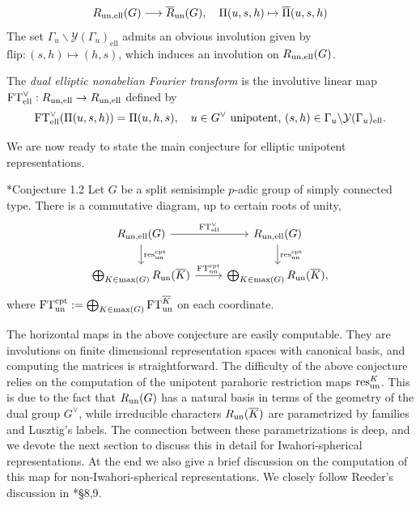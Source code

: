 \begin{equation}
    R_{\mathrm{un},\mathrm{ell}}(G)\longrightarrow\overline{R}_{\mathrm{un}}(G),\quad\Pi(u,s,h)\mapsto\overline{\Pi}(u,s,h)
\end{equation}
The set $\Gamma_u\backslash\mathcal{Y}(\Gamma_u)_{\mathrm{ell}}$ admits an obvious involution given by $\mathrm{flip}:(s,h)\mapsto(h,s)$, which induces an involution on $R_{\mathrm{un},\mathrm{ell}}(G)$.
\begin{definition}
    The \textit{dual elliptic nonabelian Fourier transform} is the involutive linear map $\mathrm{FT}^\vee_{\mathrm{ell}}:R_{\mathrm{un},\mathrm{ell}}\rightarrow R_{\mathrm{un},\mathrm{ell}}$ defined by
    \begin{equation*}
        \mathrm{FT}^\vee_{\mathrm{ell}}(\Pi(u,s,h))=\Pi(u,h,s),\quad u\in G^\vee\text{ unipotent, }(s,h)\in\Gamma_u\backslash\mathcal{Y}(\Gamma_u)_{\mathrm{ell}}.
    \end{equation*}
\end{definition}

We are now ready to state the main conjecture for elliptic unipotent representations.

\begin{conjecture}\cite{AubertCiubotaruRomano2024}*{Conjecture 1.2}
    Let $G$ be a split semisimple $p$-adic group of simply connected type. There is a commutative diagram, up to certain roots of unity,
    \[
        \begin{tikzcd}
        R_{\un,\text{ell}}(G) \arrow[r, "\FT^\vee_{\text{ell}}"] \arrow[d, "\res_{\un}^{\cpt}"] & R_{\un,\text{ell}}(G) \arrow[d, "\res_{\un}^{\cpt}"] \\
        \bigoplus_{K\in\max(G)}R_{\un}(\overline{K}) \arrow[r, "\FT^{\cpt}_{\un}"] & \bigoplus_{K\in\max(G)}R_{\un}(\overline{K}),
        \end{tikzcd}
    \]
    where $\mathrm{FT}^{\mathrm{cpt}}_{\mathrm{un}}:=\bigoplus_{K\in\max(G)}\mathrm{FT}^{\overline{K}}_{\mathrm{un}}$ on each coordinate.
\end{conjecture}

The horizontal maps in the above conjecture are easily computable. They are involutions on finite dimensional representation spaces with canonical basis, and computing the matrices is straightforward. The difficulty of the above conjecture relies on the computation of the unipotent parahoric restriction maps $\mathrm{res}^K_{\mathrm{un}}$. This is due to the fact that $R_{\mathrm{un}}(G)$ has a natural basis in terms of the geometry of the dual group $G^\vee$, while irreducible characters $R_{\mathrm{un}}(\overline{K})$ are parametrized by families and Lusztig's labels. The connection between these parametrizations is deep, and we devote the next section to discuss this in detail for Iwahori-spherical representations. At the end we also give a brief discussion on the computation of this map for non-Iwahori-spherical representations. We closely follow Reeder's discussion in \cite{Reeder2000}*{\S8,9}.